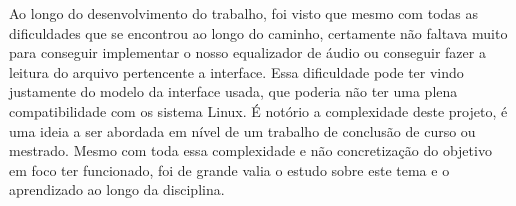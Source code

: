 \documentclass[conference]{IEEEtran}
\begin{document}
Ao longo do desenvolvimento do trabalho, foi visto que mesmo com todas as dificuldades que se encontrou ao longo do caminho, certamente não faltava muito para conseguir implementar o nosso equalizador de áudio ou conseguir fazer a leitura do arquivo pertencente a interface. Essa dificuldade pode ter vindo justamente do modelo da interface usada, que poderia não ter uma plena compatibilidade com os sistema Linux. É notório a complexidade deste projeto, é uma ideia a ser abordada em nível de um trabalho de conclusão de curso ou mestrado. Mesmo com toda essa complexidade e não concretização do objetivo em foco ter funcionado, foi de grande valia o estudo sobre este tema e o aprendizado ao longo da disciplina. %








\end{document}
